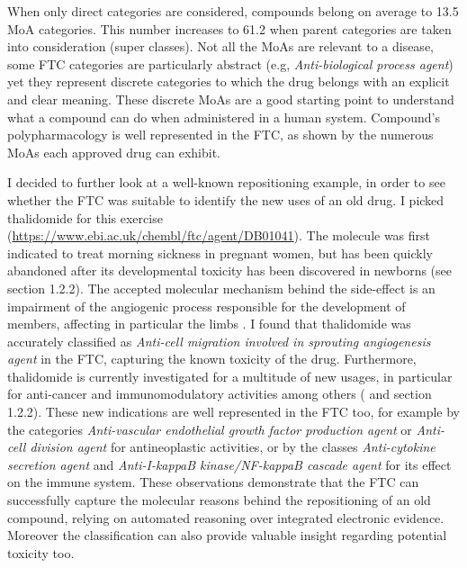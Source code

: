 When only direct categories are considered, compounds belong on average to 13.5 MoA categories. This number increases to 61.2 when parent categories are taken into consideration (super classes). Not all the MoAs are relevant to a disease, some FTC categories are particularly abstract (e.g, \emph{Anti-biological process agent}) yet they represent discrete categories to which the drug belongs with an explicit and clear meaning. These discrete MoAs are a good starting point to understand what a compound can do when administered in a human system. Compound's polypharmacology is well represented in the FTC, as shown by the numerous MoAs each approved drug can exhibit.

I decided to further look at a well-known repositioning example, in order to see whether the FTC was suitable to identify the new uses of an old drug. I picked thalidomide for this exercise (\url{https://www.ebi.ac.uk/chembl/ftc/agent/DB01041}). The molecule was first indicated to treat morning sickness in pregnant women, but has been quickly abandoned after its developmental toxicity has been discovered in newborns (see section 1.2.2). The accepted molecular mechanism behind the side-effect is  an impairment of the angiogenic process responsible for the development of members, affecting in particular the limbs \citep{therapontos2009thalidomide}. I found that thalidomide was accurately classified as \emph{Anti-cell migration involved in sprouting angiogenesis agent} in the FTC, capturing the known toxicity of the drug. Furthermore, thalidomide is currently investigated for a multitude of new usages, in particular for anti-cancer and immunomodulatory activities among others (\cite{teo2005thalidomide} and section 1.2.2). These new indications are well represented in the FTC too, for example by the categories \emph{Anti-vascular endothelial growth factor production agent} or \emph{Anti-cell division agent} for antineoplastic activities, or by the classes \emph{Anti-cytokine secretion agent} and \emph{Anti-I-kappaB kinase/NF-kappaB cascade agent} for its effect on the immune system. These observations demonstrate that the FTC can successfully capture the molecular reasons behind the repositioning of an old compound, relying on automated reasoning over integrated electronic evidence. Moreover the classification can also provide valuable insight regarding potential toxicity too.

